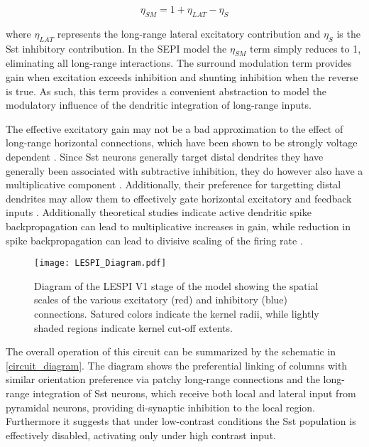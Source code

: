 \begin{equation}
  \eta_{SM} = 1 + \eta_{LAT} - \eta_{S}
\end{equation}

where $\eta_{LAT}$ represents the long-range lateral excitatory
contribution and $\eta_{S}$ is the Sst inhibitory contribution. In the
SEPI model the $\eta_{SM}$ term simply reduces to 1, eliminating all
long-range interactions. The surround modulation term provides gain
when excitation exceeds inhibition and shunting inhibition when the
reverse is true. As such, this term provides a convenient abstraction
to model the modulatory influence of the dendritic integration of
long-range inputs.

The effective excitatory gain may not be a bad approximation to the
effect of long-range horizontal connections, which have been shown to
be strongly voltage dependent \citep{Hirsch1991}. Since Sst neurons
generally target distal dendrites they have generally been associated
with subtractive inhibition, they do however also have a
multiplicative component \citep{Wilson2012}. Additionally, their
preference for targetting distal dendrites may allow them to
effectively gate horizontal excitatory and feedback inputs
\citep{Ma2011, Gentet2012}. Additionally theoretical studies indicate
active dendritic spike backpropagation can lead to multiplicative
increases in gain, while reduction in spike backpropagation can lead
to divisive scaling of the firing rate \citep{Mehaffey2005}.

\begin{figure}
	\centering
        \texttt{[image: LESPI\_Diagram.pdf]}
	\caption{Diagram of the LESPI V1 stage of the model showing the
          spatial scales of the various excitatory (red) and
          inhibitory (blue) connections. Satured colors indicate the
          kernel radii, while lightly shaded regions indicate kernel
          cut-off extents.}
	\label{LESPIDiagram}
\end{figure}

The overall operation of this circuit can be summarized by the
schematic in \ref{circuit_diagram}. The diagram shows the preferential
linking of columns with similar orientation preference via patchy
long-range connections and the long-range integration of Sst neurons,
which receive both local and lateral input from pyramidal neurons,
providing di-synaptic inhibition to the local region. Furthermore it
suggests that under low-contrast conditions the Sst population is
effectively disabled, activating only under high contrast input.

